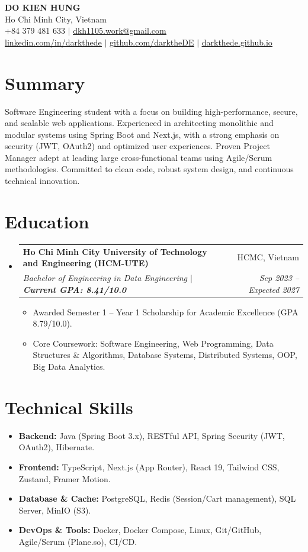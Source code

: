 \documentclass[10pt,a4paper]{article}
\makeatletter
\newcommand{\resumeItem}[1]{
  \item\small{
    {#1 \vspace{-2pt}}
  }
}
\newcommand{\resumeSubheading}[4]{
  \vspace{-1pt}\item
    \begin{tabular*}{0.97\textwidth}[t]{l@{\extracolsep{\fill}}r}
      \textbf{#1} & \small#2 \\
      \textit{\small#3} & \textit{\small #4} \\
    \end{tabular*}\vspace{-5pt}
}
\newcommand{\resumeSubHeadingListStart}{\begin{itemize}[leftmargin=0.15in, label={}]}
\newcommand{\resumeSubHeadingListEnd}{\end{itemize}}
\newcommand{\resumeItemListStart}{\begin{itemize}}
\newcommand{\resumeItemListEnd}{\end{itemize}\vspace{-5pt}}
\makeatother
\begin{document}
\begin{center}
    {\Huge \textbf{DO KIEN HUNG}} \\ \vspace{5pt}
    Ho Chi Minh City, Vietnam \\
    \small +84 379 481 633 $|$ \href{mailto:dkh1105.work@gmail.com}{\underline{dkh1105.work@gmail.com}} \\
    \href{https://www.linkedin.com/in/darkthede/}{\underline{linkedin.com/in/darkthede}} $|$
    \href{https://github.com/darktheDE}{\underline{github.com/darktheDE}} $|$
    \href{https://darkthede.github.io/}{\underline{darkthede.github.io}}
\end{center}

\section{Summary}
Software Engineering student with a focus on building high-performance, secure, and scalable web applications. Experienced in architecting monolithic and modular systems using Spring Boot and Next.js, with a strong emphasis on security (JWT, OAuth2) and optimized user experiences. Proven Project Manager adept at leading large cross-functional teams using Agile/Scrum methodologies. Committed to clean code, robust system design, and continuous technical innovation.

\section{Education}
  \resumeSubHeadingListStart
    \resumeSubheading
      {Ho Chi Minh City University of Technology and Engineering (HCM-UTE)}{HCMC, Vietnam}
      {Bachelor of Engineering in Data Engineering $|$ \textbf{Current GPA: 8.41/10.0}}{Sep 2023 -- Expected 2027}
      \resumeItemListStart
        \resumeItem{Awarded Semester 1 -- Year 1 Scholarship for Academic Excellence (GPA 8.79/10.0).}
        \resumeItem{Core Coursework: Software Engineering, Web Programming, Data Structures \& Algorithms, Database Systems, Distributed Systems, OOP, Big Data Analytics.}
      \resumeItemListEnd
  \resumeSubHeadingListEnd

\section{Technical Skills}
  \resumeSubHeadingListStart
    \resumeItemListStart
        \resumeItem{\textbf{Backend:} Java (Spring Boot 3.x), RESTful API, Spring Security (JWT, OAuth2), Hibernate.}
        \resumeItem{\textbf{Frontend:} TypeScript, Next.js (App Router), React 19, Tailwind CSS, Zustand, Framer Motion.}
        \resumeItem{\textbf{Database \& Cache:} PostgreSQL, Redis (Session/Cart management), SQL Server, MinIO (S3).}
        \resumeItem{\textbf{DevOps \& Tools:} Docker, Docker Compose, Linux, Git/GitHub, Agile/Scrum (Plane.so), CI/CD.}
    \resumeItemListEnd
  \resumeSubHeadingListEnd
\end{document}
